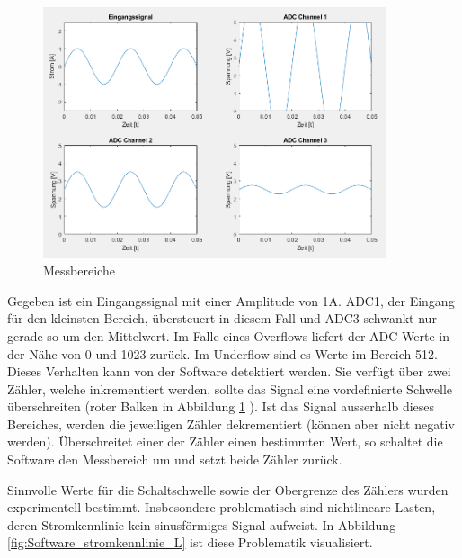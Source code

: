 \begin{figure}[H]
\begin{center}
\includegraphics[width=0.9\textwidth]{images/Software_messbereich.png}
\caption{Messbereiche}
\label{fig:Software_messbereich}
\end{center}
\end{figure}

Gegeben ist ein Eingangssignal mit einer Amplitude von 1A. ADC1, der Eingang für den kleinsten Bereich, übersteuert in diesem Fall und ADC3 schwankt nur gerade so um den Mittelwert. Im Falle eines Overflows liefert der ADC Werte in der Nähe von 0 und 1023 zurück. Im Underflow sind es Werte im Bereich 512. Dieses Verhalten kann von der Software detektiert werden. Sie verfügt über zwei Zähler, welche inkrementiert werden, sollte das Signal eine vordefinierte Schwelle überschreiten (roter Balken in Abbildung \ref{fig:Software_messbereich} ). Ist das Signal ausserhalb dieses Bereiches, werden die jeweiligen Zähler dekrementiert (können aber nicht negativ werden). Überschreitet einer der Zähler einen bestimmten Wert, so schaltet die Software den Messbereich um und setzt beide Zähler zurück.

Sinnvolle Werte für die Schaltschwelle sowie der Obergrenze des Zählers wurden experimentell bestimmt. Insbesondere problematisch sind nichtlineare Lasten, deren Stromkennlinie kein sinusförmiges Signal aufweist. In Abbildung \ref{fig:Software_stromkennlinie_L} ist diese Problematik visualisiert.


